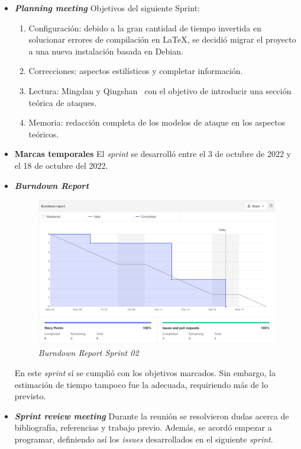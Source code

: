 \begin{itemize}
	\item \textbf{\textit{Planning meeting}}
	Objetivos del siguiente Sprint:
	
	\begin{enumerate}
		\item Configuración: debido a la gran cantidad de tiempo invertida en solucionar errores de compilación en \LaTeX{}, se decidió migrar el proyecto a una nueva instalación basada en Debian.
		\item Correcciones: aspectos estilísticos y completar información.
		\item Lectura: Mingdan y Qingshan~\cite{mingdan2018ShillingAttacksAReview} con el objetivo de introducir una sección teórica de ataques.
		\item Memoria: redacción completa de los modelos de ataque en los aspectos teóricos.
		
	\end{enumerate}
	
	\item \textbf{Marcas temporales}
	El \textit{sprint} se desarrolló entre el 3 de octubre de 2022 y el 18 de octubre del 2022.
	
	\item \textbf{\textit{Burndown Report}}
	\begin{figure}[h]
		\caption{\textit{Burndown Report Sprint 02}}
		\centering
		\includegraphics[width=\textwidth]{../img/anexos/s02_bdr}
	\end{figure}
		
	En este \textit{sprint} sí se cumplió con los objetivos marcados. Sin embargo, la estimación de tiempo tampoco fue la adecuada, requiriendo más de lo previsto.
	\item \textbf{\textit{Sprint review meeting}}
	Durante la reunión se resolvieron dudas acerca de bibliografía, referencias y trabajo previo. Además, se acordó empezar a programar, definiendo así los \textit{issues} desarrollados en el siguiente \textit{sprint}.
	
\end{itemize}

